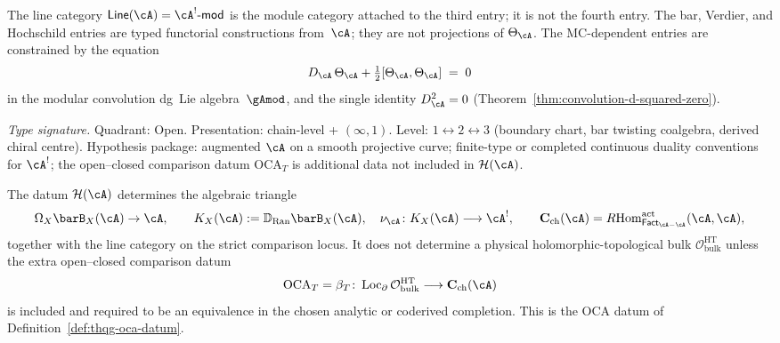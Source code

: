 The line category $\mathsf{Line}(\cA)=\cA^!\text{-}\mathsf{mod}$ is
the module category attached to the third entry; it is not the fourth
entry. The bar, Verdier, and Hochschild entries are typed functorial
constructions from~$\cA$; they are not projections of
$\Theta_\cA$. The MC-dependent entries are constrained by the equation
\begin{equation}\label{eq:supp-mc-equation-holographic-intro}
D_\cA\,\Theta_\cA + \tfrac{1}{2}[\Theta_\cA, \Theta_\cA] \;=\; 0
\end{equation}
in the modular convolution dg~Lie algebra~$\gAmod$, and the single
identity $D_\cA^2 = 0$
(Theorem~\ref{thm:convolution-d-squared-zero}).

\begin{proposition}
\label{prop:supp-algebraic-physical-bulk-separation}
\textit{Type signature.}
Quadrant: Open. Presentation: chain-level + $(\infty,1)$.
Level: $1 \leftrightarrow 2 \leftrightarrow 3$ (boundary chart, bar
twisting coalgebra, derived chiral centre).
Hypothesis package: augmented $\cA$ on a smooth projective curve;
finite-type or completed continuous duality conventions for
$\cA^!$; the open--closed comparison datum
$\mathrm{OCA}_T$ is additional data not included in
$\mathcal{H}(\cA)$.
\medskip

The datum $\mathcal{H}(\cA)$ determines the algebraic triangle
\[
\Omega_X\barB_X(\cA)\to\cA,\qquad
K_X(\cA):=\mathbb{D}_{\operatorname{Ran}}\barB_X(\cA),\quad
\nu_{\cA}\colon K_X(\cA)\longrightarrow\cA^!,\qquad
\mathbf{C}_{\mathrm{ch}}(\cA)=
R\!\operatorname{Hom}^{\mathrm{act}}_{\mathsf{Fact}_{\cA-\cA}}(\cA,\cA),
\]
together with the line category on the strict comparison locus. It
does not determine a physical holomorphic-topological bulk
$\mathcal{O}^{\mathrm{HT}}_{\mathrm{bulk}}$ unless the extra
open--closed comparison datum
\[
\mathrm{OCA}_T=\beta_T\colon
\operatorname{Loc}_{\partial}
\mathcal{O}^{\mathrm{HT}}_{\mathrm{bulk}}
\longrightarrow
\mathbf{C}_{\mathrm{ch}}(\cA)
\]
is included and required to be an equivalence in the chosen analytic or
coderived completion. This is the OCA datum of
Definition~\ref{def:thqg-oca-datum}.
\end{proposition}

